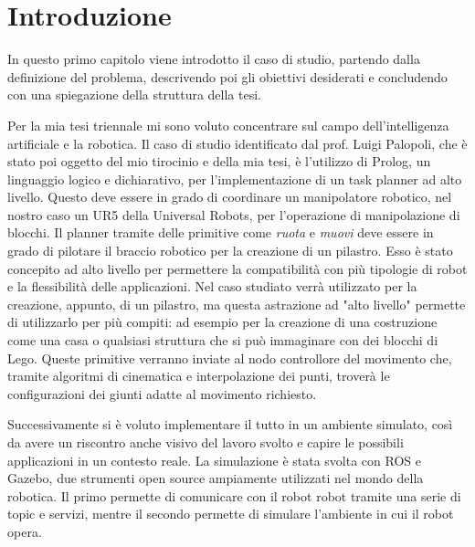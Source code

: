 \chapter{Introduzione}
\label{cha:intro}


In questo primo capitolo viene introdotto il caso di studio, partendo dalla definizione del problema, descrivendo poi gli obiettivi desiderati
e concludendo con una spiegazione della struttura della tesi.

Per la mia tesi triennale mi sono voluto concentrare sul campo dell'intelligenza artificiale e la robotica. Il caso di studio identificato
dal prof. Luigi Palopoli, che è stato poi oggetto del mio tirocinio e della mia tesi, è l'utilizzo di Prolog, un linguaggio logico e dichiarativo, per l'implementazione di un task planner ad alto livello.
Questo deve essere in grado di coordinare un manipolatore robotico, nel nostro caso un UR5 della Universal Robots, per l'operazione di manipolazione di blocchi.
Il planner tramite delle primitive come \textit{ruota} e \textit{muovi} deve essere in grado di pilotare il braccio robotico per la
creazione di un pilastro. Esso è stato concepito ad alto livello per permettere la compatibilità con più tipologie di robot e la flessibilità
delle applicazioni. Nel caso studiato verrà utilizzato per la creazione, appunto, di un pilastro, ma questa astrazione ad
"alto livello" permette di utilizzarlo per più compiti: ad esempio per la creazione di una costruzione come una casa o qualsiasi struttura
che si può immaginare con dei blocchi di Lego. Queste primitive verranno inviate al nodo controllore del movimento che, tramite algoritmi di cinematica e
interpolazione dei punti, troverà le configurazioni dei giunti adatte al movimento richiesto. 

Successivamente si è voluto implementare il tutto in un
ambiente simulato, così da avere un riscontro anche visivo del lavoro svolto e capire le possibili applicazioni in un contesto reale.
La simulazione è stata svolta con ROS e Gazebo, due strumenti open source ampiamente utilizzati nel mondo della robotica. Il primo permette di
comunicare con il robot robot tramite una serie di topic e servizi, mentre il secondo permette di simulare l'ambiente in cui il robot opera.

